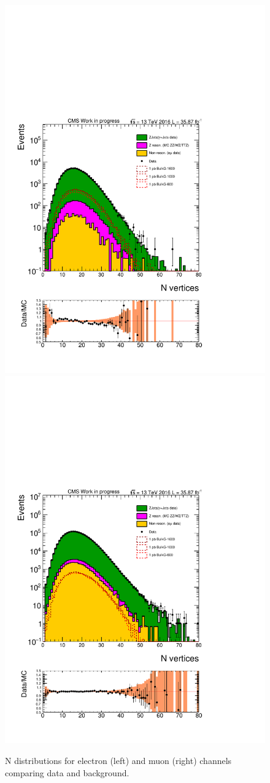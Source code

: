 \begin{figure}[htbp!]
\centering
\includegraphics[width=0.46\linewidth, page=1]{figures/ReMiniSummer16_DT_PhReMiniMCRcFixXsec_GMCPhPtWt_tightzpt50_puWeightsummer16_muoneg_gjet_metfilter_unblind_el_log_1pb.pdf}
\includegraphics[width=0.46\linewidth, page=1]{figures/ReMiniSummer16_DT_PhReMiniMCRcFixXsec_GMCPhPtWt_tightzpt50_puWeightsummer16_muoneg_gjet_metfilter_unblind_mu_log_1pb.pdf}
\caption{N distributions for electron (left) and muon (right) channels
comparing data and background.}
\label{fig:gjet_nvtx}
\end{figure}

